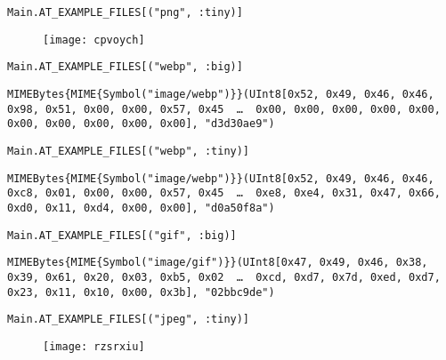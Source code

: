 \begin{lstlisting}[]
Main.AT_EXAMPLE_FILES[("png", :tiny)]
\end{lstlisting}

\begin{figure}[H]
\centering
\texttt{[image: cpvoych]}
\end{figure}




\begin{lstlisting}[]
Main.AT_EXAMPLE_FILES[("webp", :big)]
\end{lstlisting}


\begin{lstlisting}[]
MIMEBytes{MIME{Symbol("image/webp")}}(UInt8[0x52, 0x49, 0x46, 0x46, 0x98, 0x51, 0x00, 0x00, 0x57, 0x45  …  0x00, 0x00, 0x00, 0x00, 0x00, 0x00, 0x00, 0x00, 0x00, 0x00], "d3d30ae9")
\end{lstlisting}




\begin{lstlisting}[]
Main.AT_EXAMPLE_FILES[("webp", :tiny)]
\end{lstlisting}


\begin{lstlisting}[]
MIMEBytes{MIME{Symbol("image/webp")}}(UInt8[0x52, 0x49, 0x46, 0x46, 0xc8, 0x01, 0x00, 0x00, 0x57, 0x45  …  0xe8, 0xe4, 0x31, 0x47, 0x66, 0xd0, 0x11, 0xd4, 0x00, 0x00], "d0a50f8a")
\end{lstlisting}




\begin{lstlisting}[]
Main.AT_EXAMPLE_FILES[("gif", :big)]
\end{lstlisting}


\begin{lstlisting}[]
MIMEBytes{MIME{Symbol("image/gif")}}(UInt8[0x47, 0x49, 0x46, 0x38, 0x39, 0x61, 0x20, 0x03, 0xb5, 0x02  …  0xcd, 0xd7, 0x7d, 0xed, 0xd7, 0x23, 0x11, 0x10, 0x00, 0x3b], "02bbc9de")
\end{lstlisting}




\begin{lstlisting}[]
Main.AT_EXAMPLE_FILES[("jpeg", :tiny)]
\end{lstlisting}

\begin{figure}[H]
\centering
\texttt{[image: rzsrxiu]}
\end{figure}



